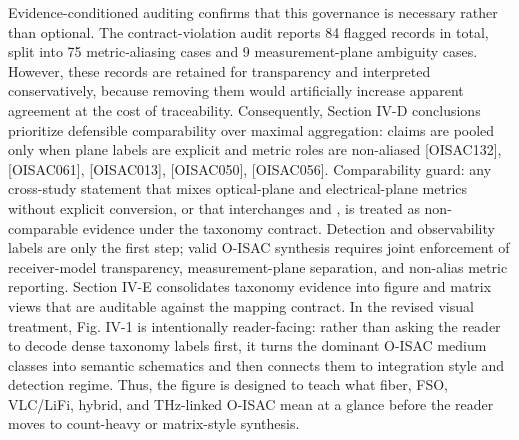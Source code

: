 {}Evidence-conditioned auditing confirms that this governance is necessary rather than optional. The contract-violation audit reports 84 flagged records in total, split into 75 metric-aliasing cases and 9 measurement-plane ambiguity cases. However, these records are retained for transparency and interpreted conservatively, because removing them would artificially increase apparent agreement at the cost of traceability. Consequently, Section IV-D conclusions prioritize defensible comparability over maximal aggregation: claims are pooled only when plane labels are explicit and metric roles are non-aliased [O\markdownRendererUnderscore{}ISAC\markdownRendererUnderscore{}132], [O\markdownRendererUnderscore{}ISAC\markdownRendererUnderscore{}061], [O\markdownRendererUnderscore{}ISAC\markdownRendererUnderscore{}013], [O\markdownRendererUnderscore{}ISAC\markdownRendererUnderscore{}050], [O\markdownRendererUnderscore{}ISAC\markdownRendererUnderscore{}056].\markdownRendererParagraphSeparator
{}Comparability guard: any cross-study statement that mixes optical-plane and electrical-plane metrics without explicit conversion, or that interchanges  and , is treated as non-comparable evidence under the taxonomy contract.\markdownRendererParagraphSeparator
{} Detection and observability labels are only the first step; valid O-ISAC synthesis requires joint enforcement of receiver-model transparency, measurement-plane separation, and non-alias metric reporting.\markdownRendererInterblockSeparator
{}\markdownRendererThematicBreak{}\markdownRendererInterblockSeparator
{}
\markdownRendererSectionEnd 
\markdownRendererSectionEnd \markdownRendererSectionBegin
{}\markdownRendererInterblockSeparator
{}\markdownRendererSectionBegin
{}\markdownRendererInterblockSeparator
{}Section IV-E consolidates taxonomy evidence into figure and matrix views that are auditable against the mapping contract. In the revised visual treatment, Fig. IV-1 is intentionally reader-facing: rather than asking the reader to decode dense taxonomy labels first, it turns the dominant O-ISAC medium classes into semantic schematics and then connects them to integration style and detection regime. Thus, the figure is designed to teach what fiber, FSO, VLC/LiFi, hybrid, and THz-linked O-ISAC mean at a glance before the reader moves to count-heavy or matrix-style synthesis.\markdownRendererParagraphSeparator
